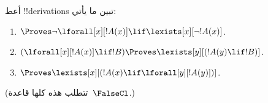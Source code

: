 \documentclass[../../../include/open-logic-section]{subfiles}
\begin{document}
\begin{prob}
أعط !!{derivation}s تبين ما يأتي:
\begin{enumerate}
\item $\Proves \lnot\lforall[x][!A(x)] \lif \lexists[x][\lnot!A(x)]$.
\item $(\lforall[x][!A(x)] \lif !B) \Proves \lexists[y][(!A(y) \lif !B)]$.
\item $\Proves \lexists[x][(!A(x) \lif \lforall[y][!A(y)])]$.
\end{enumerate}
(تتطلب هذه كلها قاعدة~$\FalseCl$.)
\end{prob}
\end{document}
